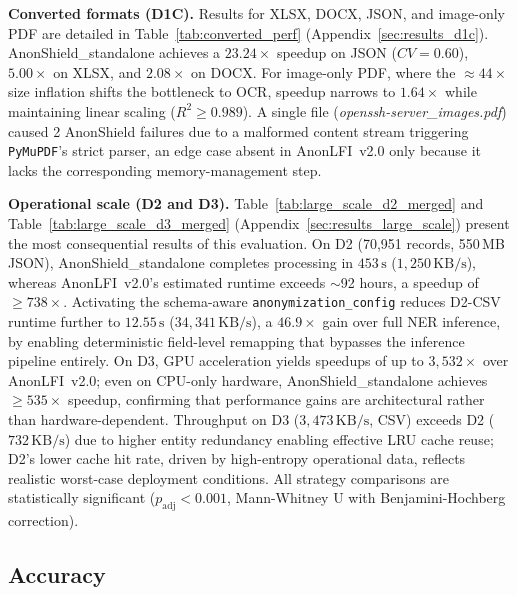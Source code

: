 \documentclass[12pt]{article}
\begin{document}
\textbf{Converted formats (D1C).}
Results for XLSX, DOCX, JSON, and image-only PDF are detailed in
Table~\ref{tab:converted_perf} (Appendix~\ref{sec:results_d1c}).
AnonShield\_standalone achieves a $23.24\times$ speedup on JSON ($CV{=}0.60$),
$5.00\times$ on XLSX, and $2.08\times$ on DOCX. For image-only PDF, where the
${\approx}44\times$ size inflation shifts the bottleneck to OCR, speedup narrows
to $1.64\times$ while maintaining linear scaling ($R^2 \geq 0.989$). A single
file (\textit{openssh-server\_images.pdf}) caused 2 AnonShield failures due to
a malformed content stream triggering \texttt{PyMuPDF}'s strict parser, an
edge case absent in AnonLFI~v2.0 only because it lacks the corresponding
memory-management step.

\textbf{Operational scale (D2 and D3).}
Table~\ref{tab:large_scale_d2_merged} and Table~\ref{tab:large_scale_d3_merged}
(Appendix~\ref{sec:results_large_scale}) present the most consequential results
of this evaluation. On D2 (70{,}951 records, 550\,MB JSON), AnonShield\_standalone
completes processing in $453\,\text{s}$ ($1{,}250\,\text{KB/s}$), whereas
AnonLFI~v2.0's estimated runtime exceeds ${\sim}$92 hours, a speedup of
${\geq}738\times$. Activating the schema-aware \texttt{anonymization\_config}
reduces D2-CSV runtime further to $12.55\,\text{s}$ ($34{,}341\,\text{KB/s}$),
a $46.9\times$ gain over full NER inference, by enabling deterministic
field-level remapping that bypasses the inference pipeline entirely.
On D3, GPU acceleration yields speedups of up to $3{,}532\times$ over
AnonLFI~v2.0; even on CPU-only hardware, AnonShield\_standalone achieves
${\geq}535\times$ speedup, confirming that performance gains are architectural
rather than hardware-dependent. Throughput on D3 ($3{,}473\,\text{KB/s}$, CSV)
exceeds D2 ($732\,\text{KB/s}$) due to higher entity redundancy enabling
effective LRU cache reuse; D2's lower cache hit rate, driven by high-entropy
operational data, reflects realistic worst-case deployment conditions.
All strategy comparisons are statistically significant ($p_{\text{adj}} < 0.001$,
Mann-Whitney U with Benjamini-Hochberg correction).

\subsection{Accuracy}
\end{document}
